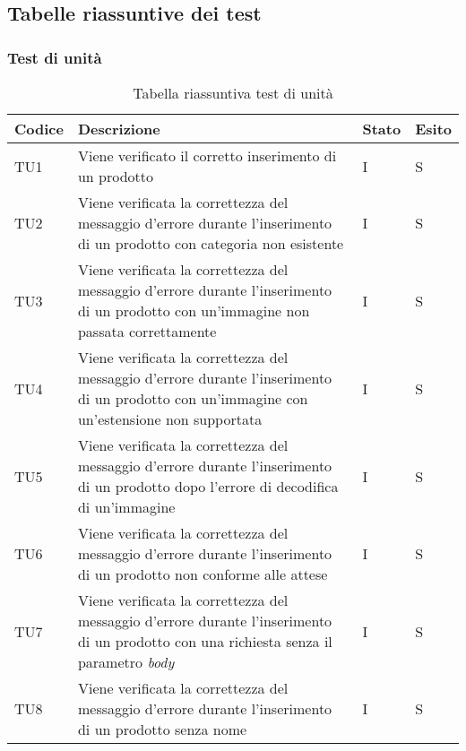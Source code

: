 \subsection{Tabelle riassuntive dei test}

\subsubsection{Test di unità}
{

\centering
\renewcommand{\arraystretch}{2}
\begin{longtable}{C{2cm} C{9.6cm} C{1.5cm} C{1cm}}
\caption{Tabella riassuntiva test di unità}\\
\textbf{Codice} &
\textbf{Descrizione}&
\textbf{Stato}&
\textbf{Esito}\\
\endhead


TU1 & Viene verificato il corretto inserimento di un prodotto & I & S\\

TU2 & Viene verificata la correttezza del messaggio d'errore durante l'inserimento di un prodotto con categoria non esistente & I & S\\


TU3 & Viene verificata la correttezza del messaggio d'errore durante l'inserimento di un prodotto con un'immagine non passata correttamente & I & S\\


TU4 & Viene verificata la correttezza del messaggio d'errore durante l'inserimento di un prodotto con un'immagine con un'estensione non supportata & I & S\\


TU5 & Viene verificata la correttezza del messaggio d'errore durante l'inserimento di un prodotto dopo l'errore di decodifica di un'immagine & I & S\\

TU6 & Viene verificata la correttezza del messaggio d'errore durante l'inserimento di un prodotto non conforme alle attese & I & S\\


TU7 & Viene verificata la correttezza del messaggio d'errore durante l'inserimento di un prodotto con una richiesta senza il parametro \textit{body} & I & S\\


TU8 & Viene verificata la correttezza del messaggio d'errore durante l'inserimento di un prodotto senza nome & I & S\\



\end{longtable}}

